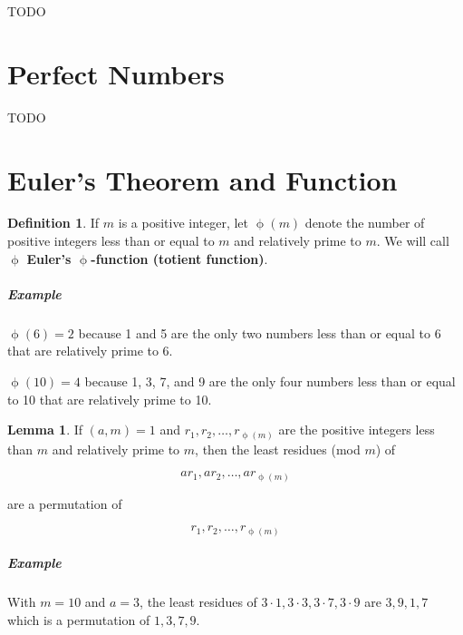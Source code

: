 \documentclass{article}
\theoremstyle{definition} %
\theoremstyle{definition}
\theoremstyle{definition}
\newtheorem{lemma}{Lemma}[section]
\newcommand{\tot}{\upphi}
\theoremstyle{definition}
\newtheorem{definition}{Definition}[section]
\begin{document}
  TODO
  
  \section{Perfect Numbers}
  
  TODO
  
  \section{Euler's Theorem and Function}
  
  \begin{definition}
    If $m$ is a positive integer, let $\tot(m)$ denote the number of positive integers
    less than or equal to $m$ and relatively prime to $m$. We will call $\tot$
    \textbf{Euler's $\tot$-function (totient function)}.
  \end{definition}
  
  \subparagraph{Example} $\tot(6) = 2$ because 1 and 5 are the only two numbers less than
  or equal to 6 that are relatively prime to 6.
  
  $\tot(10) = 4$ because 1, 3, 7, and 9 are the only four numbers less than
  or equal to 10 that are relatively prime to 10.
  
  \begin{lemma}
    If $(a, m) = 1$ and $r_1, r_2, \dots, r_{\tot(m)}$ are the positive integers less than $m$ and
    relatively prime to $m$, then the least residues (mod $m$) of
    
    \begin{equation}
      ar_1, ar_2, \dots, ar_{\tot(m)}
    \end{equation}
    
    are a permutation of
    
    \begin{equation*}
      r_1, r_2, \dots, r_{\tot(m)}
    \end{equation*}
  \end{lemma}
  
  \subparagraph{Example} With $m = 10$ and $a = 3$, the least residues of $3 \cdot 1,
  3 \cdot 3, 3 \cdot 7, 3 \cdot 9$ are $3, 9, 1, 7$ which is a permutation of $1, 3, 7, 9$.
  
\end{document}
